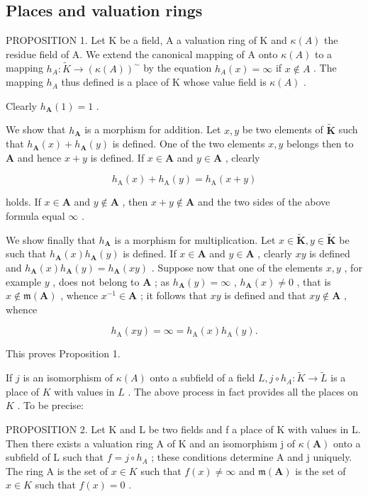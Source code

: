 \subsection{Places and valuation rings}

PROPOSITION 1. Let K be a field, A a valuation ring of K and \(\kappa(A)\) the residue field of A. We extend the canonical mapping of A onto \(\kappa(A)\) to a mapping \(h_{A}: \tilde{K} \to (\kappa(A))^{\sim}\) by the equation \(h_{A}(x) = \infty\) if \(x \notin A\) . The mapping \(h_{A}\) thus defined is a place of K whose value field is \(\kappa(A)\) .

Clearly \(h_{\mathbf{A}}(1) = 1\) .

We show that \(h_{\mathbf{A}}\) is a morphism for addition. Let \(x, y\) be two elements of \(\tilde{\mathbf{K}}\) such that \(h_{\mathbf{A}}(x) + h_{\mathbf{A}}(y)\) is defined. One of the two elements \(x, y\) belongs then to \(\mathbf{A}\) and hence \(x + y\) is defined. If \(x \in \mathbf{A}\) and \(y \in \mathbf{A}\) , clearly

\[
h _ {\mathrm{A}} (x) + h _ {\mathrm{A}} (y) = h _ {\mathrm{A}} (x + y)
\]

holds. If \(x \in \mathbf{A}\) and \(y \notin \mathbf{A}\) , then \(x + y \notin \mathbf{A}\) and the two sides of the above formula equal \(\infty\) .

We show finally that \(h_{\mathbf{A}}\) is a morphism for multiplication. Let \(x \in \tilde{\mathbf{K}}, y \in \tilde{\mathbf{K}}\) be such that \(h_{\mathbf{A}}(x)h_{\mathbf{A}}(y)\) is defined. If \(x \in \mathbf{A}\) and \(y \in \mathbf{A}\) , clearly \(xy\) is defined and \(h_{\mathbf{A}}(x)h_{\mathbf{A}}(y) = h_{\mathbf{A}}(xy)\) . Suppose now that one of the elements \(x, y\) , for example \(y\) , does not belong to \(\mathbf{A}\) ; as \(h_{\mathbf{A}}(y) = \infty\) , \(h_{\mathbf{A}}(x) \neq 0\) , that is \(x \notin \mathfrak{m}(\mathbf{A})\) , whence \(x^{-1} \in \mathbf{A}\) ; it follows that \(xy\) is defined and that \(xy \notin \mathbf{A}\) , whence

\[
h _ {\mathrm{A}} (x y) = \infty = h _ {\mathrm{A}} (x) h _ {\mathrm{A}} (y).
\]

This proves Proposition 1.

If \(j\) is an isomorphism of \(\kappa(A)\) onto a subfield of a field \(L, j \circ h_{A}: \tilde{K} \to \tilde{L}\) is a place of \(K\) with values in \(L\) . The above process in fact provides all the places on \(K\) . To be precise:

PROPOSITION 2. Let K and L be two fields and f a place of K with values in L. Then there exists a valuation ring A of K and an isomorphism j of \(\kappa(\mathbf{A})\) onto a subfield of L such that \(f = j \circ h_{A}\) ; these conditions determine A and j uniquely. The ring A is the set of \(x \in K\) such that \(f(x) \neq \infty\) and \(\mathfrak{m}(\mathbf{A})\) is the set of \(x \in K\) such that \(f(x) = 0\) .

